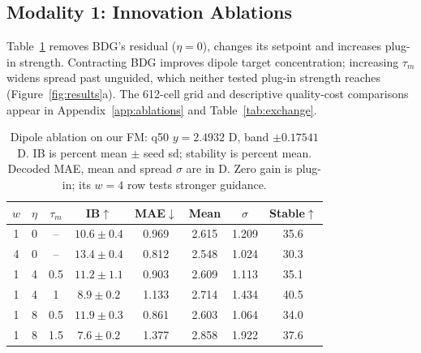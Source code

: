 \documentclass{article}
\begin{document}
\subsection{Modality 1: Innovation Ablations}\label{sec:ablations}
Table~\ref{tab:ablation} removes BDG's residual ($\eta=0$), changes its setpoint and increases plug-in strength. Contracting BDG improves dipole target concentration; increasing $\tau_m$ widens spread past unguided, which neither tested plug-in strength reaches (Figure~\ref{fig:results}a). The 612-cell grid and descriptive quality-cost comparisons appear in Appendix~\ref{app:ablations} and Table~\ref{tab:exchange}.
\begin{table}[!htbp]
\centering\small
\caption{Dipole ablation on our FM: q50 $y=2.4932$ D, band $\pm0.17541$ D. IB is percent mean $\pm$ seed sd; stability is percent mean. Decoded MAE, mean and spread $\sigma$ are in D. Zero gain is plug-in; its $w=4$ row tests stronger guidance.}
\label{tab:ablation}
\begin{tabular}{cccccccc}
\toprule
$w$ & $\eta$ & $\tau_m$ & IB$\uparrow$ & MAE$\downarrow$ & Mean & $\sigma$ & Stable$\uparrow$\\
\midrule
1 & 0 & -- & $10.6\pm0.4$ & 0.969 & 2.615 & 1.209 & 35.6\\
4 & 0 & -- & $13.4\pm0.4$ & 0.812 & 2.548 & 1.024 & 30.3\\
1 & 4 & 0.5 & $11.2\pm1.1$ & 0.903 & 2.609 & 1.113 & 35.1\\
1 & 4 & 1 & $8.9\pm0.2$ & 1.133 & 2.714 & 1.434 & 40.5\\
1 & 8 & 0.5 & $11.9\pm0.3$ & 0.861 & 2.603 & 1.064 & 34.0\\
1 & 8 & 1.5 & $7.6\pm0.2$ & 1.377 & 2.858 & 1.922 & 37.6\\
\bottomrule
\end{tabular}
\end{table}
\end{document}
